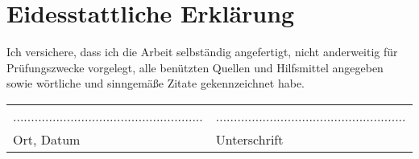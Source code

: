 \chapter*{Eidesstattliche Erklärung}
\thispagestyle{empty}

Ich versichere, dass ich die Arbeit selbständig angefertigt, nicht anderweitig für Prüfungszwecke vorgelegt, alle benützten Quellen und Hilfsmittel angegeben sowie wörtliche und sinngemäße Zitate gekennzeichnet habe.

\vspace{4em}

\begin{tabular}{@{} p{} l @{}}
..................................................... & ..................................................... \\
Ort, Datum                                            & Unterschrift
\end{tabular}

